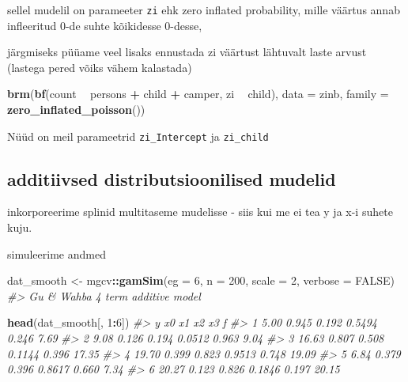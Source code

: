 \documentclass[]{book}
\newenvironment{Shaded}{\begin{snugshade}}{\end{snugshade}}
\newcommand{\KeywordTok}[1]{\textcolor[rgb]{0.13,0.29,0.53}{\textbf{#1}}}
\newcommand{\DataTypeTok}[1]{\textcolor[rgb]{0.13,0.29,0.53}{#1}}
\newcommand{\DecValTok}[1]{\textcolor[rgb]{0.00,0.00,0.81}{#1}}
\newcommand{\StringTok}[1]{\textcolor[rgb]{0.31,0.60,0.02}{#1}}
\newcommand{\CommentTok}[1]{\textcolor[rgb]{0.56,0.35,0.01}{\textit{#1}}}
\newcommand{\OtherTok}[1]{\textcolor[rgb]{0.56,0.35,0.01}{#1}}
\newcommand{\OperatorTok}[1]{\textcolor[rgb]{0.81,0.36,0.00}{\textbf{#1}}}
\newcommand{\NormalTok}[1]{#1}
\begin{document}
sellel mudelil on parameeter \texttt{zi} ehk zero inflated probability,
mille väärtus annab infleeritud 0-de suhte kõikidesse 0-desse,

järgmiseks püüame veel lisaks ennustada zi väärtust lähtuvalt laste
arvust (lastega pered võiks vähem kalastada)

\begin{Shaded}
\begin{Highlighting}[]
\KeywordTok{brm}\NormalTok{(}\KeywordTok{bf}\NormalTok{(count }\OperatorTok{~}\StringTok{ }\NormalTok{persons }\OperatorTok{+}\StringTok{ }\NormalTok{child }\OperatorTok{+}\StringTok{ }\NormalTok{camper, }
\NormalTok{       zi }\OperatorTok{~}\StringTok{ }\NormalTok{child), }\DataTypeTok{data =}\NormalTok{ zinb, }\DataTypeTok{family =} \KeywordTok{zero_inflated_poisson}\NormalTok{())}
\end{Highlighting}
\end{Shaded}

Nüüd on meil parameetrid \texttt{zi\_Intercept} ja \texttt{zi\_child}

\subsection{additiivsed distributsioonilised
mudelid}\label{additiivsed-distributsioonilised-mudelid}

inkorporeerime splinid multitaseme mudelisse - siis kui me ei tea y ja
x-i suhete kuju.

simuleerime andmed

\begin{Shaded}
\begin{Highlighting}[]
\NormalTok{dat_smooth <-}\StringTok{ }\NormalTok{mgcv}\OperatorTok{::}\KeywordTok{gamSim}\NormalTok{(}\DataTypeTok{eg =} \DecValTok{6}\NormalTok{, }\DataTypeTok{n =} \DecValTok{200}\NormalTok{, }\DataTypeTok{scale =} \DecValTok{2}\NormalTok{, }\DataTypeTok{verbose =} \OtherTok{FALSE}\NormalTok{)}
\CommentTok{#> Gu & Wahba 4 term additive model}
\end{Highlighting}
\end{Shaded}

\begin{Shaded}
\begin{Highlighting}[]
\KeywordTok{head}\NormalTok{(dat_smooth[, }\DecValTok{1}\OperatorTok{:}\DecValTok{6}\NormalTok{])}
\CommentTok{#>       y    x0    x1     x2    x3     f}
\CommentTok{#> 1  5.00 0.945 0.192 0.5494 0.246  7.69}
\CommentTok{#> 2  9.08 0.126 0.194 0.0512 0.963  9.04}
\CommentTok{#> 3 16.63 0.807 0.508 0.1144 0.396 17.35}
\CommentTok{#> 4 19.70 0.399 0.823 0.9513 0.748 19.09}
\CommentTok{#> 5  6.84 0.379 0.396 0.8617 0.660  7.34}
\CommentTok{#> 6 20.27 0.123 0.826 0.1846 0.197 20.15}
\end{Highlighting}
\end{Shaded}
\end{document}
